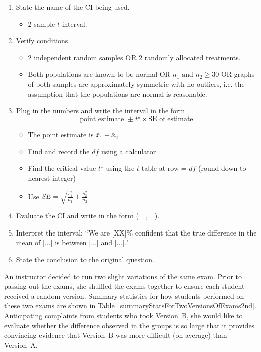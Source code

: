 \begin{termBox}{
\begin{enumerate}
\setlength{\itemsep}{0mm}
\item State the name of the CI being used.\vspace{-1.5mm}
\begin{itemize}
\setlength{\itemsep}{0mm}
\item 2-sample $t$-interval.
\end{itemize}
\item Verify conditions.\vspace{-1.5mm}
\begin{itemize}
\item 2 independent random samples OR 2 randomly allocated treatments.
\item Both populations are known to be normal OR $n_1 \text{ and } n_2\ge 30$ OR graphs of both samples are approximately symmetric with no outliers, i.e. the assumption that the populations are normal is reasonable.
\end{itemize}
\item Plug in the numbers and write the interval in the form
$$\text{point estimate } \pm t^\star \times \text{SE of estimate}$$
\begin{itemize}
\setlength{\itemsep}{0mm}
\item The point estimate is $\bar{x}_1-\bar{x}_2$
\item Find and record the $df$ using a calculator
\item Find the critical value $t^\star$ using the $t$-table at row = $df$ (round down to nearest integer)
\item Use $SE = \sqrt{\frac{s^2_1}{n_1}+\frac{s^2_2}{n_2}}$
\end{itemize}
\item Evaluate the CI and write in the form ( $\_$ , $\_$ ).
\item Interpret the interval:  ``We are [XX]\% confident that the true difference in the mean of [...] is between [...] and [...]."
\item State the conclusion to the original question.
\end{enumerate}}
\end{termBox}


An instructor decided to run two slight variations of the same exam. Prior to passing out the exams, she shuffled the exams together to ensure each student received a random version. Summary statistics for how students performed on these two exams are shown in Table~\ref{summaryStatsForTwoVersionsOfExams2nd}. Anticipating complaints from students who took Version~B, she would like to evaluate whether the difference observed in the groups is so large that it provides convincing evidence that Version~B was more difficult (on average) than Version~A.

